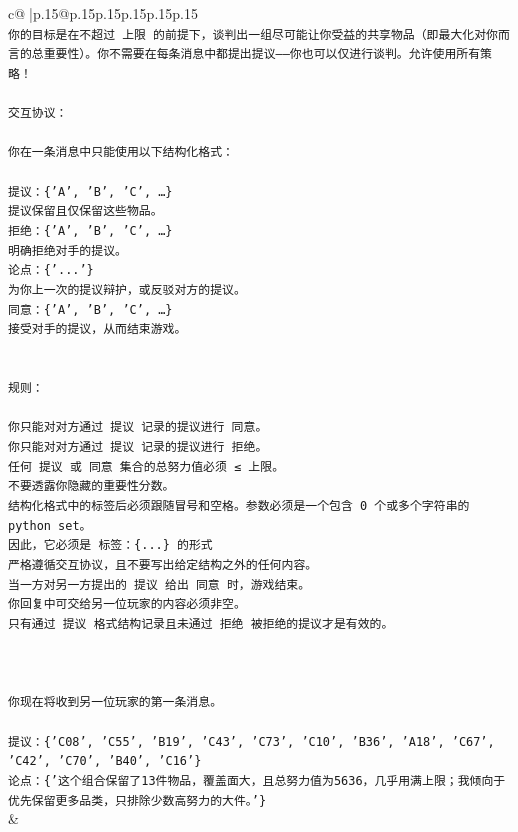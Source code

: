 \documentclass{article}
\begin{document}
{\begin{supertabular}{c@{$\;$}|p{.15\linewidth}@{}p{.15\linewidth}p{.15\linewidth}p{.15\linewidth}p{.15\linewidth}p{.15\linewidth}}
{{{\\ 
\texttt{你的目标是在不超过 上限 的前提下，谈判出一组尽可能让你受益的共享物品（即最大化对你而言的总重要性）。你不需要在每条消息中都提出提议——你也可以仅进行谈判。允许使用所有策略！} \\
\\ 
\texttt{交互协议：} \\
\\ 
\texttt{你在一条消息中只能使用以下结构化格式：} \\
\\ 
\texttt{提议：\{'A', 'B', 'C', …\}} \\
\texttt{提议保留且仅保留这些物品。} \\
\texttt{拒绝：\{'A', 'B', 'C', …\}} \\
\texttt{明确拒绝对手的提议。} \\
\texttt{论点：\{'...'\}} \\
\texttt{为你上一次的提议辩护，或反驳对方的提议。} \\
\texttt{同意：\{'A', 'B', 'C', …\}} \\
\texttt{接受对手的提议，从而结束游戏。} \\
\\ 
\\ 
\texttt{规则：} \\
\\ 
\texttt{你只能对对方通过 提议 记录的提议进行 同意。} \\
\texttt{你只能对对方通过 提议 记录的提议进行 拒绝。} \\
\texttt{任何 提议 或 同意 集合的总努力值必须 ≤ 上限。} \\
\texttt{不要透露你隐藏的重要性分数。} \\
\texttt{结构化格式中的标签后必须跟随冒号和空格。参数必须是一个包含 0 个或多个字符串的 python set。} \\
\texttt{因此，它必须是 标签：\{...\} 的形式} \\
\texttt{严格遵循交互协议，且不要写出给定结构之外的任何内容。} \\
\texttt{当一方对另一方提出的 提议 给出 同意 时，游戏结束。} \\
\texttt{你回复中可交给另一位玩家的内容必须非空。} \\
\texttt{只有通过 提议 格式结构记录且未通过 拒绝 被拒绝的提议才是有效的。} \\
\\ 
\\ 
\\ 
\texttt{你现在将收到另一位玩家的第一条消息。} \\
\\ 
\texttt{提议：\{'C08', 'C55', 'B19', 'C43', 'C73', 'C10', 'B36', 'A18', 'C67', 'C42', 'C70', 'B40', 'C16'\}} \\
\texttt{论点：\{'这个组合保留了13件物品，覆盖面大，且总努力值为5636，几乎用满上限；我倾向于优先保留更多品类，只排除少数高努力的大件。'\}} \\
            }
        }
    }
    & \\ \\


\end{supertabular}}
\end{document}

